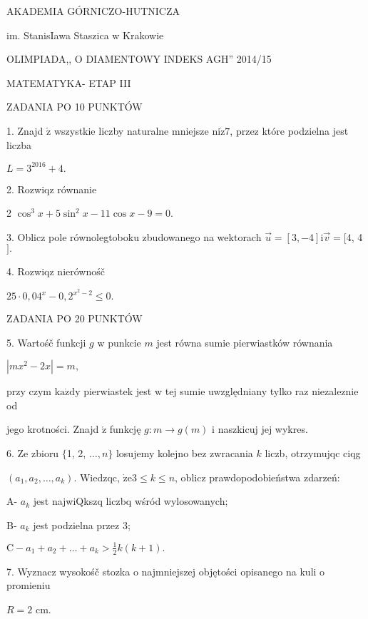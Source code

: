 \documentclass[a4paper,12pt]{article}
\begin{document}
AKADEMIA GÓRNICZO-HUTNICZA

im. StanisIawa Staszica w Krakowie

OLIMPIADA,, O DIAMENTOWY INDEKS AGH'' 2014/15

MATEMATYKA- ETAP III

ZADANIA PO 10 PUNKTÓW

1. Znajd $\acute{\mathrm{z}}$ wszystkie liczby naturalne mniejsze $\mathrm{n}\mathrm{i}\dot{\mathrm{z}}7$, przez które podzielna jest liczba

$L=3^{2016}+4.$

2. Rozwiqz równanie

2 $\cos^{3}x+5\sin^{2}x-11\cos x-9=0.$

3. Oblicz pole równolegtoboku zbudowanego na wektorach $\vec{u}=[3,-4]\mathrm{i}\vec{v}=[4$, 4$].$

4. Rozwiqz nierównośč

$25\cdot 0,04^{x}-0,2^{x^{2}-2}\leq 0.$

ZADANIA PO 20 PUNKTÓW

5. Wartośč funkcji $g$ w punkcie $m$ jest równa sumie pierwiastków równania

$|mx^{2}-2x|=m,$

przy czym $\mathrm{k}\mathrm{a}\dot{\mathrm{z}}\mathrm{d}\mathrm{y}$ pierwiastek jest w tej sumie uwzględniany tylko raz niezaleznie od

jego krotności. Znajd $\acute{\mathrm{z}}$ funkcję $g:m\rightarrow g(m)$ i naszkicuj jej wykres.

6. Ze zbioru $\{$1, 2, $\ldots, n\}$ losujemy kolejno bez zwracania $k$ liczb, otrzymujqc ciqg

$(a_{1},a_{2},\ldots,a_{k})$. Wiedzqc, $\dot{\mathrm{z}}\mathrm{e}3\leq k\leq n$, oblicz prawdopodobieństwa zdarzeń:

A- $a_{k}$ jest najwiQkszq liczbq wśród wylosowanych;

B- $a_{k}$ jest podzielna przez 3;

$\displaystyle \mathrm{C}-a_{1}+a_{2}+\ldots+a_{k}>\frac{1}{2}k(k+1).$

7. Wyznacz wysokośč stozka o najmniejszej objętości opisanego na kuli o promieniu

$R=2$ cm.
\end{document}
